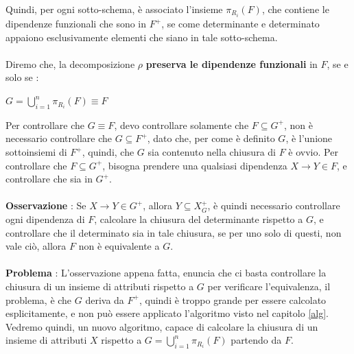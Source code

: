 \documentclass[12pt, letterpaper]{article}
\newcommand{\acc}{\\\hphantom{}\\}
\begin{document}
Quindi, per ogni sotto-schema, è associato l'insieme \(\pi_{R_i}(F)\), che contiene le dipendenze funzionali che sono in \(F^+\), se come determinante e 
determinato appaiono esclusivamente elementi che siano in tale sotto-schema.\acc Diremo che, 
la decomposizione \(\rho\) \textbf{preserva le dipendenze funzionali} in \(F\), se e solo se :\begin{center}
     \(G=\displaystyle\bigcup^n_{i=1}\pi_{R_i}(F)\equiv F\)
\end{center}
Per controllare che \(G\equiv F\), devo controllare solamente che \(F\subseteq G^+\), non è necessario controllare 
che \(G\subseteq F^+\), dato che, per come è definito \(G\), è l'unione sottoinsiemi di
\(F^+\), quindi, che \(G\) sia contenuto nella chiusura di \(F\) è ovvio. Per controllare che \(F\subseteq G^+\), bisogna prendere 
una qualsiasi dipendenza \(X\rightarrow Y \in F\), e controllare che sia in \(G^+\).\acc 
\textbf{Osservazione }: Se \(X\rightarrow Y \in G^+\), allora \(Y\subseteq X^+_G\), è quindi necessario controllare 
ogni dipendenza di \(F\), calcolare la chiusura del determinante rispetto a \(G\), e controllare che il determinato sia 
in tale chiusura, se per uno solo di questi, non vale ciò, allora \(F\) non è equivalente a \(G\).
\acc\textbf{Problema }: L'osservazione appena fatta, enuncia che ci basta controllare la chiusura di un insieme di attributi 
rispetto a \(G\) per verificare l'equivalenza, il problema, è che \(G\) deriva da \(F^+\), quindi è troppo grande per 
essere calcolato esplicitamente, e non può essere applicato l'algoritmo visto nel capitolo \ref{alg}. Vedremo quindi, un nuovo algoritmo, 
capace di calcolare la chiusura di un insieme di attributi \(X\) rispetto a \(G=\displaystyle\bigcup^n_{i=1}\pi_{R_i}(F)\) partendo da \(F\).
\end{document}
